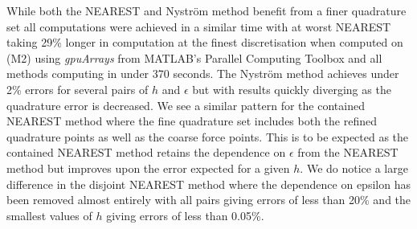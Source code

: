 While both the NEAREST and Nyström method benefit from a finer quadrature set all computations were achieved in a similar time with at worst NEAREST taking 29\% longer in computation at the finest discretisation when computed on (M2) using \textit{gpuArrays} from MATLAB's Parallel Computing Toolbox \cite{Gallagher2020} and all methods computing in under 370 seconds. The Nyström method achieves under 2\% errors for several pairs of $h$ and $\epsilon$ but with results quickly diverging as the quadrature error is decreased. We see a similar pattern for the contained NEAREST method where the fine quadrature set includes both the refined quadrature points as well as the coarse force points. This is to be expected as the contained NEAREST method retains the dependence on $\epsilon$ from the NEAREST method but improves upon the error expected for a given $h$. We do notice a large difference in the disjoint NEAREST method where the dependence on epsilon has been removed almost entirely with all pairs giving errors of less than 20\% and the smallest values of $h$ giving errors of less than 0.05\%. 
